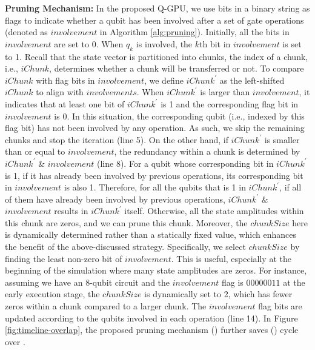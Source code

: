 \noindent \textbf{Pruning Mechanism: }In the proposed Q-GPU, we use bits in a binary string as flags to indicate whether a qubit has been involved after a set of gate operations (denoted as $involvement$ in Algorithm \ref{alg:pruning}). Initially, all the bits in $involvement$ are set to 0. When $q_k$ is involved, the $k$th bit in $involvement$ is set to 1. Recall that the state vector is partitioned into chunks, the index of a chunk, i.e., $iChunk$, determines whether a chunk will be transferred or not. 
To compare $iChunk$ with flag bits in $involvement$, we define $iChunk^{\prime}$ as the left-shifted $iChunk$ to align with $involvements$. When $iChunk^{\prime}$ is larger than $involvement$, it indicates that at least one bit of $iChunk^{\prime}$ is 1 and the corresponding flag bit in $involvement$ is 0. In this situation, the corresponding qubit (i.e., indexed by this flag bit) has not been involved by any operation. 
As such, we skip the remaining chunks and stop the iteration (line 5). On the other hand, if $iChunk^{\prime}$ is smaller than or equal to $involvement$, the redundancy within a chunk is determined by $iChunk^{\prime}$ \& $involvement$ (line 8). 
For a qubit whose corresponding bit in $iChunk^{\prime}$ is 1, if it has already been involved by previous operations, its corresponding bit in $involvement$ is also 1. 
Therefore, for all the qubits that is 1 in $iChunk^{\prime}$, if all of them have already been involved by previous operations, $iChunk^{\prime}$ $\&$ $involvement$ results in $iChunk^{\prime}$ itself. Otherwise, all the state amplitudes within this chunk are zeros, and we can prune this chunk. Moreover, the $chunkSize$ here is dynamically determined rather than a statically fixed value, which enhances the benefit of the above-discussed strategy. Specifically, we select $chunkSize$ by finding the least non-zero bit of $involvement$. 
This is useful, especially at the beginning of the simulation where many state amplitudes are zeros. For instance, assuming we have an 8-qubit circuit and the $involvement$ flag is $00000011$ at the early execution stage, the $chunkSize$ is dynamically set to 2, which has fewer zeros within a chunk compared to a larger chunk. The $involvement$ flag bits are updated according to the qubits involved in each operation (line 14). In Figure \ref{fig:timeline-overlap}, the proposed pruning mechanism () further saves () cycle over .  


